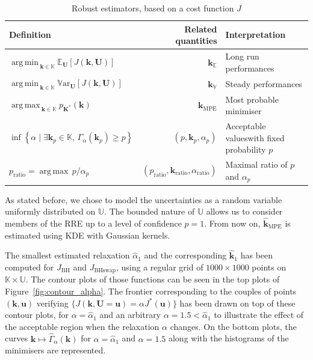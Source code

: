 \documentclass[preprint, review, 1p]{elsarticle}
\DeclareMathOperator*{\argmin}{arg\,min \,}
\DeclareMathOperator*{\argmax}{arg\,max \,}
\newcommand{\Var}{\mathbb{V}\textrm{ar}}
\newcommand{\Ex}{\mathbb{E}}
\newcommand{\kmean}{{\mathbf{k}}_{\Ex}}
\newcommand{\kvar}{{\mathbf{k}}_{\mathbb{V}}}
\newcommand{\kmpe}{{\mathbf{k}}_{\mathrm{MPE}}}
\newcommand{\hatkmpe}{\hat{\mathbf{k}}_{\mathrm{MPE}}}
\newcommand{\RRE}{RRE}
\newcommand{\checkap}{{\alpha}_p}
\newcommand{\checka}{{\alpha}}
\newcommand{\checkk}{\mathbf{k}}
\newcommand{\checkkp}{{\mathbf{k}}_p}
\newcommand{\Kspace}{\mathbb{K}}
\newcommand{\Uspace}{\mathbb{U}}
\newcommand{\JBH}{J_{\mathrm{BH}}}
\newcommand{\JBHS}{J_{\mathrm{BHswap}}}
\begin{document}
\begin{table}[!h]
  \centering
\begin{tabular}{lrp{5cm}}
  \toprule
  Definition & Related quantities & Interpretation \\ \midrule
   $\argmin_{\mathbf{k}\in\Kspace} \Ex_{\mathbf{U}}\left[J(\mathbf{k},\mathbf{U})\right]$& $\kmean$ & Long run performances\\
   $\argmin_{\mathbf{k}\in\Kspace} \Var_{\mathbf{U}}\left[J(\mathbf{k},\mathbf{U})\right]$& $\kvar$  & Steady performances\\
   $\argmax_{\mathbf{k}\in\Kspace} p_{\mathbf{K}^*}(\mathbf{k})$ & $\kmpe$ & Most probable minimiser\\
    $\inf\left\{ \alpha \mid \exists \checkkp \in \Kspace,\, \Gamma_{\alpha}(\checkkp) \geq p \right\}$ & $(p, \checkkp,\checkap)$ & Acceptable values\newline with fixed probability $p$ \\
    $p_{\mathrm{ratio}} = \argmax p/\checkap$ & $(p_{\mathrm{ratio}}, \checkk_{\mathrm{ratio}}, \checka_{\mathrm{ratio}})$ & Maximal ratio of $p$ and $\checkap$ \\
  \bottomrule
\end{tabular}
\caption{Robust estimators, based on a cost function $J$}
\label{tab:RO_recap}
\end{table}


As stated before, we chose to model the uncertainties as a random variable uniformly distributed on $\Uspace$. The bounded nature of $\Uspace$ allows us to consider members of the \RRE{} up to a level of confidence $p=1$.
From now on, $\hatkmpe$ is estimated using KDE with Gaussian kernels.


The smallest estimated relaxation $\hat{\checka}_1$ and the corresponding $\hat{\checkk}_1$ has been computed for $\JBH$ and $\JBHS$, using a regular grid of $1000 \times 1000$ points on $\Kspace\times\Uspace$. The contour plots of those functions can be seen in the top plots of Figure~\ref{fig:contour_alpha}. The frontier corresponding to the couples of points $(\mathbf{k},\mathbf{u})$ verifying $\{J(\mathbf{k},\mathbf{U}=\mathbf{u}) = \alpha J^*(\mathbf{u})\}$ has been drawn on top of these contour plots, for $\alpha=\hat{\checka}_1$ and an arbitrary $\alpha=1.5<\hat{\checka}_1$ to illustrate the effect of the acceptable region when the relaxation $\alpha$ changes. 
On the bottom plots, the curves $\mathbf{k}\mapsto \hat{\Gamma}_{\alpha}(\mathbf{k})$ for $\alpha=\hat{\checka}_1$ and $\alpha=1.5$ along with the histograms of the minimisers are represented.
\end{document}
